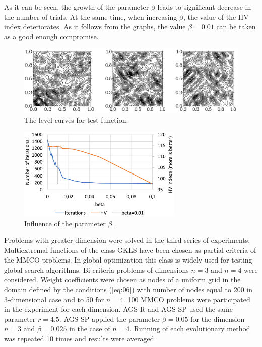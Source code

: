 \documentclass[runningheads]{llncs}
\begin{document}
As it can be seen, the growth of the parameter $\beta$ leads to significant decrease in the number of trials. At the same time, when increasing $\beta$, the value of the HV index deteriorates. As it follows from the graphs, the value $\beta=0.01$ can be taken as a good enough compromise.

\begin{figure}
\centering
\includegraphics[width=\textwidth]{fig2}
\caption{The level curves for test function.} \label{fig:2}
\end{figure}

\begin{figure}
\centering
\includegraphics[width=0.7\textwidth]{fig3}
\caption{Influence of the parameter $\beta$.} \label{fig:3}
\end{figure}

Problems with greater dimension were solved in the third series of experiments. Multiextremal functions of the class GKLS \cite{Gaviano2003} have been chosen as partial criteria of the MMCO problems.  In global optimization this class is widely used for testing global search algorithms. Bi-criteria problems of dimensions $n=3$ and $n=4$ were considered. Weight coefficients were chosen as nodes of a uniform grid in the domain defined by the conditions (\ref{eq:06}) with number of nodes equal to 200 in 3-dimensional case and to 50 for $n=4$. 100 MMCO problems were participated in the experiment for each dimension. AGS-R and AGS-SP used the same parameter $r=4.5$. AGS-SP applied the parameter $\beta=0.05$ for the dimension $n=3$ and $\beta=0.025$ in the case of $n=4$.  Running of each evolutionary method was repeated 10 times and results were averaged.   
\end{document}
